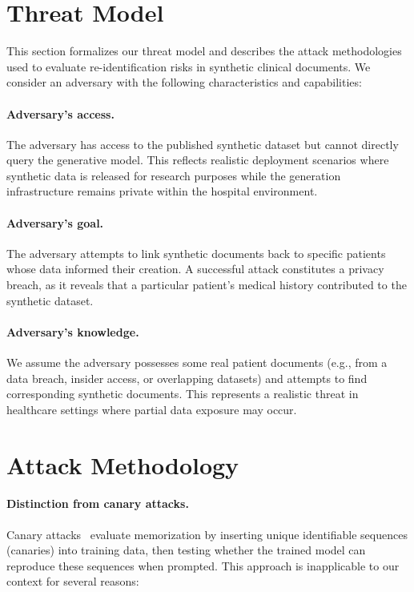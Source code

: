 \section{Threat Model}
\label{sec:threat_model}

This section formalizes our threat model and describes the attack methodologies used to evaluate re-identification risks in synthetic clinical documents.
We consider an adversary with the following characteristics and capabilities:

\paragraph{Adversary's access.} The adversary has access to the published synthetic dataset but cannot directly query the generative model. This reflects realistic deployment scenarios where synthetic data is released for research purposes while the generation infrastructure remains private within the hospital environment.

\paragraph{Adversary's goal.} The adversary attempts to link synthetic documents back to specific patients whose data informed their creation. A successful attack constitutes a privacy breach, as it reveals that a particular patient's medical history contributed to the synthetic dataset.

\paragraph{Adversary's knowledge.} We assume the adversary possesses some real patient documents (e.g., from a data breach, insider access, or overlapping datasets) and attempts to find corresponding synthetic documents. This represents a realistic threat in healthcare settings where partial data exposure may occur.

\section{Attack Methodology}
\paragraph{Distinction from canary attacks.} Canary attacks~\cite{carlini2019secret_sharer} evaluate memorization by inserting unique identifiable sequences (canaries) into training data, then testing whether the trained model can reproduce these sequences when prompted. This approach is inapplicable to our context for several reasons:

